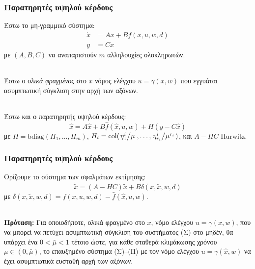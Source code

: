 \documentclass{beamer}
\begin{document}
    \begin{frame}
        \frametitle{Παρατηρητές υψηλού κέρδους}
        Έστω το μη-γραμμικό σύστημα:
        \[\tag{Σ}\begin{split}
            \dot x &= A x +  B f(x, u, w, d)\\
            y &= Cx
        \end{split}\]
        με $(A, B, C)$ να αναπαριστούν $m$ αλληλουχίες ολοκληρωτών.\\~\
        
        \pause
        Έστω ο \emph{ολικά φραγμένος} στο $x$ νόμος ελέγχου $u = \gamma(x, w)$ που εγγυάται ασυμπτωτική σύγκλιση στην αρχή των αξόνων.\\~\
        
        \pause
        Έστω και ο παρατηρητής υψηλού κέρδους:
        \[
            \dot{\hat{x}} = A \hat x + B \hat f(\hat x, u, w) + H(y - C\hat x)
        \]
        με $Η = \mathrm{bdiag}(H_1, \ldots, H_m)$, $H_i = \mathrm{col}(\flatfrac{\eta_1^i}{\mu},\ldots, \flatfrac{\eta_{r_i}^i}{\mu^{r_i}})$, και $A-HC$ \textlatin{Hurwitz}.
    
    \end{frame}

    \begin{frame}
        \frametitle{Παρατηρητές υψηλού κέρδους}
        Ορίζουμε το σύστημα των σφαλμάτων εκτίμησης:
        \[\tag{Π}
            \dot{\tilde x} = (A - HC) \tilde x + B \delta(x, \tilde x, w, d)
        \]
        με $\delta(x, \tilde x, w, d) = f(x, u, w, d) - \hat f(\hat x, u, w)$.\\~\
    
        \pause
        \textbf{Πρόταση:} Για οποιοδήποτε, ολικά φραγμένο στο $x$, νόμο ελέγχου $u = \gamma(x, w)$, που να μπορεί να πετύχει ασυμπτωτική σύγκλιση του συστήματος (Σ) στο μηδέν, θα υπάρχει ένα $0 < \bar\mu < 1$ τέτοιο ώστε, για κάθε σταθερά κλιμάκωσης χρόνου $\mu \in (0, \bar \mu)$, το επαυξημένο σύστημα (Σ)--(Π) με τον νόμο ελέγχου $u = \gamma(\hat x, w)$ να έχει ασυμπτωτικά ευσταθή αρχή των αξόνων.
    \end{frame}
\end{document}

